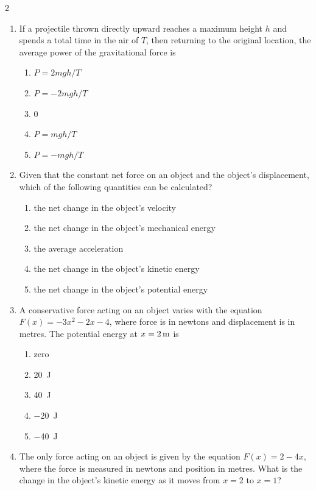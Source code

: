 {\begin{multicols*}{2}
\begin{enumerate}[leftmargin=12pt,itemsep=4pt]
    \item If a projectile thrown directly upward reaches a maximum height $h$
      and spends a total time in the air of $T$, then returning to the original
      location, the average power of the gravitational force is
      \begin{enumerate}
      \item $P=2mgh/T$
      \item $P=-2mgh/T$
      \item 0
      \item $P=mgh/T$
      \item $P=-mgh/T$
      \end{enumerate}
    
    \item Given that the constant net force on an object and the object's 
      displacement, which of the following quantities can be calculated?
      \begin{enumerate}
      \item the net change in the object's velocity
      \item the net change in the object's mechanical energy
      \item the average acceleration
      \item the net change in the object's kinetic energy
      \item the net change in the object's potential energy
      \end{enumerate}
    
    \item A conservative force acting on an object varies with the equation
      $F(x)=-3x^2-2x-4$, where force is in newtons and displacement is in
      metres. The potential energy at $x=\SI2\metre$ is
      \begin{enumerate}
      \item zero
      \item\SI{20}\joule
      \item\SI{40}\joule
      \item\SI{-20}\joule
      \item\SI{-40}\joule
      \end{enumerate}

    \item The only force acting on an object is given by the equation
      $F(x)=2-4x$, where the force is measured in newtons and position in
      metres. What is the change in the object's kinetic energy as it moves
      from $x=2$ to $x=1$?
    

\end{enumerate}
\end{multicols*}}
